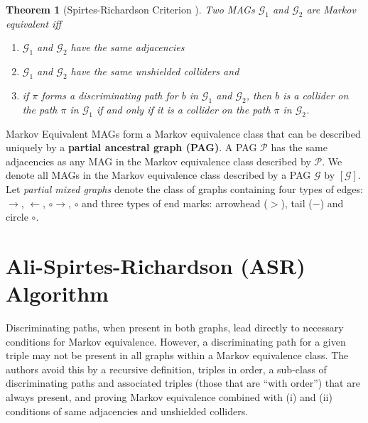 \documentclass[a4paper]{article}
\newtheorem{theorem}{Theorem}
\begin{document}
\begin{theorem}[Spirtes-Richardson Criterion \cite{spirtes1996}]
	\label{thrm:spirtes1996}
	Two MAGs $\mathcal{G}_1$ and $\mathcal{G}_2$ are Markov equivalent iff
	\begin{enumerate}
		\item $\mathcal{G}_1$ and $\mathcal{G}_2$ have the same adjacencies
		\item $\mathcal{G}_1$ and $\mathcal{G}_2$ have the same unshielded colliders and
		\item if $\pi$ forms a discriminating path for $b$ in $\mathcal{G}_1$ and $\mathcal{G}_2$, then $b$ is a collider on the path $\pi$ in $\mathcal{G}_1$ if and only if it is a collider on the path $\pi$ in $\mathcal{G}_2$.
	\end{enumerate}
\end{theorem}

Markov Equivalent MAGs form a Markov equivalence class that can be described uniquely by a \textbf{partial ancestral graph (PAG)}. A PAG $\mathcal{P}$ has the same adjacencies as any MAG in the Markov equivalence class described by $\mathcal{P}$. We denote all MAGs in the Markov equivalence class described by a PAG $\mathcal{G}$ by $[\mathcal{G}]$. Let \textit{partial mixed graphs} denote the class of graphs containing four types of edges: $\rightarrow$, $\leftarrow$, $\circ \rightarrow$, $\circ$ and three types of end marks: arrowhead ($>$), tail ($-$) and circle $\circ$.

\section{Ali-Spirtes-Richardson (ASR) \cite{ali2009} Algorithm}

Discriminating paths, when present in both graphs, lead directly to necessary conditions for Markov equivalence. However, a discriminating path for a given triple may not be present in all graphs within a Markov equivalence class. The authors avoid this by a recursive definition, triples in order, a sub-class of discriminating paths and associated triples (those that are “with order”) that are always present, and proving Markov equivalence combined with (i) and (ii) conditions of same adjacencies and unshielded colliders.
\end{document}
